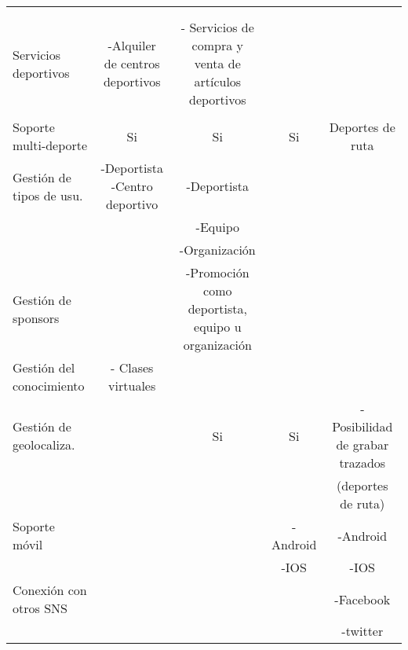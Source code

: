\begin{landscape}
\begin{table}
\begin{center}
{\begin{tabular}{|l|llll|}
\multicolumn{1}{|c|}{} &  &  &  &  \\ 
 & \multicolumn{1}{c}{} & \multicolumn{1}{c}{} & \multicolumn{1}{c}{} & \multicolumn{1}{c|}{} \\ 
\hline
Servicios deportivos & \multicolumn{1}{c}{-Alquiler de centros deportivos} & \multicolumn{1}{c}{- Servicios de compra y venta de artículos deportivos} & \multicolumn{1}{c}{} & \multicolumn{1}{c|}{} \\ 
 & \multicolumn{1}{c}{} & \multicolumn{1}{c}{} & \multicolumn{1}{c}{} & \multicolumn{1}{c|}{} \\ 
\hline
Soporte multi-deporte & \multicolumn{1}{c}{Si} & \multicolumn{1}{c}{Si} & \multicolumn{1}{c}{Si} & \multicolumn{1}{c|}{Deportes de ruta} \\ 
\hline
Gestión de tipos de usu. & \multicolumn{1}{c}{-Deportista -Centro deportivo} & \multicolumn{1}{c}{-Deportista } & \multicolumn{1}{c}{} & \multicolumn{1}{c|}{} \\ 
 & \multicolumn{1}{c}{} & \multicolumn{1}{c}{-Equipo} & \multicolumn{1}{c}{} & \multicolumn{1}{c|}{} \\ 
 & \multicolumn{1}{c}{} & \multicolumn{1}{c}{ -Organización} & \multicolumn{1}{c}{} & \multicolumn{1}{c|}{} \\ 
\hline
Gestión de sponsors & \multicolumn{1}{c}{} & \multicolumn{1}{c}{-Promoción como deportista, equipo u organización} & \multicolumn{1}{c}{} & \multicolumn{1}{c|}{} \\ 
\hline
Gestión del conocimiento & \multicolumn{1}{c}{- Clases virtuales} & \multicolumn{1}{c}{} & \multicolumn{1}{c}{} & \multicolumn{1}{c|}{} \\ 
\hline
Gestión de geolocaliza. & \multicolumn{1}{c}{} & \multicolumn{1}{c}{Si} & \multicolumn{1}{c}{Si} & \multicolumn{1}{c|}{- Posibilidad de grabar trazados} \\ 
 & \multicolumn{1}{c}{} & \multicolumn{1}{c}{} & \multicolumn{1}{c}{} & \multicolumn{1}{c|}{(deportes de ruta)} \\ 
\hline
Soporte móvil & \multicolumn{1}{c}{} & \multicolumn{1}{c}{} & \multicolumn{1}{c}{-Android} & \multicolumn{1}{c|}{-Android} \\ 
 & \multicolumn{1}{c}{} & \multicolumn{1}{c}{} & \multicolumn{1}{c}{-IOS} & \multicolumn{1}{c|}{-IOS} \\ 
\hline
Conexión con otros SNS & \multicolumn{1}{c}{} & \multicolumn{1}{c}{} & \multicolumn{1}{c}{} & \multicolumn{1}{c|}{-Facebook} \\ 
 & \multicolumn{1}{c}{} & \multicolumn{1}{c}{} & \multicolumn{1}{c}{} & \multicolumn{1}{c|}{-twitter} \\ 
\hline
\end{tabular}
  }
      \end{center}
\end{table}


\end{landscape}
